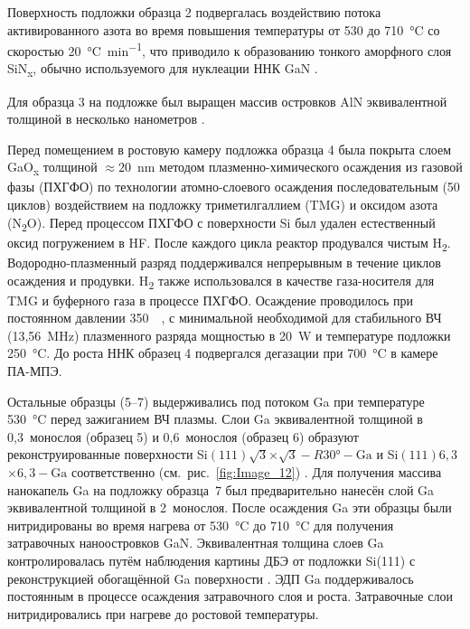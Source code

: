 Поверхность подложки образца 2 подвергалась воздействию потока активированного
азота во время повышения температуры от 530 до 710~\si{\degreeCelsius} со
скоростью 20~\si{\degreeCelsius\per\minute}, что приводило к образованию
тонкого аморфного слоя SiN\textsubscript{x}, обычно используемого для нуклеации
ННК GaN \cite{Wierzbicka2013}.

Для образца 3 на подложке был выращен массив островков AlN эквивалентной
толщиной в несколько нанометров \cite{Bolshakov2018}.

Перед помещением в ростовую камеру подложка образца 4 была покрыта слоем
GaO\textsubscript{x} толщиной \(\approx 20\)~\si{\nano\meter} методом
плазменно-химического осаждения из газовой фазы (ПХГФО) по технологии
атомно-слоевого осаждения \cite{Altuntas2014, Ramachandran2014}
последовательным (50 циклов) воздействием на подложку триметилгаллием (TMG) и
оксидом азота (N\textsubscript{2}O). Перед процессом ПХГФО с поверхности Si был
удален естественный оксид погружением в HF. После каждого цикла реактор
продувался чистым H\textsubscript{2}. Водородно-плазменный разряд поддерживался
непрерывным в течение циклов осаждения и продувки. H\textsubscript{2} также
использовался в качестве газа-носителя для TMG и буферного газа в процессе
ПХГФО. Осаждение проводилось при постоянном давлении 350~\si{\milli\torr}, с
минимальной необходимой для стабильного ВЧ (13,56~\si{\mega\hertz}) плазменного
разряда мощностью в 20~\si{\watt} и температуре подложки
250~\si{\degreeCelsius}. До роста ННК образец 4 подвергался дегазации при
700~\si{\degreeCelsius} в камере ПА-МПЭ.

Остальные образцы (5--7) выдерживались под потоком Ga при температуре
530~\si{\degreeCelsius} перед зажиганием ВЧ плазмы. Слои Ga эквивалентной
толщиной в 0,3~монослоя (образец 5) и 0,6~монослоя (образец 6) образуют
реконструированные поверхности  Si\((111)\sqrt{3}\)\(\times\)\(\sqrt{3} -
R30\si{\degree} - \text{Ga}\) и Si\((111)6,3\)\(\times\)\(6,3 - \text{Ga}\)
соответственно (см.~рис.~\cref{fig:Image_12}) \cite{Park1988}. Для получения
массива нанокапель Ga на подложку образца~7 был предварительно нанесён слой Ga
эквивалентной толщиной в 2~монослоя. После осаждения Ga эти образцы были
нитридированы во время нагрева от 530~\si{\degreeCelsius} до
710~\si{\degreeCelsius} для получения затравочных наноостровков GaN.
Эквивалентная толщина слоев Ga контролировалась путём наблюдения картины ДБЭ от
подложки Si(111) с реконструкцией обогащённой Ga поверхности
\cite{Fedorov2018}. ЭДП Ga поддерживалось постоянным в процессе осаждения
затравочного слоя и роста. Затравочные слои нитридировались при нагреве до
ростовой температуры.

